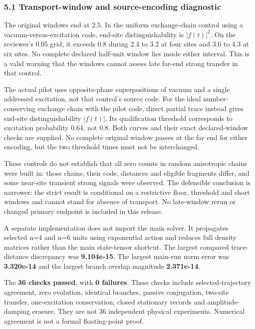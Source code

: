 \documentclass[
  10pt,
  a4paper,
]{article}
\makeatletter
\renewcommand\subsection{\@startsection{subsection}{2}{\z@}{-2ex \@plus -.8ex \@minus -.2ex}{.9ex \@plus .2ex}{\normalfont\large\bfseries}}
\makeatother
\begin{document}
\subsubsection{5.1 Transport-window and source-encoding
diagnostic}\label{transport-window-and-source-encoding-diagnostic}

The original windows end at 2.5. In the uniform exchange-chain control
using a vacuum-versus-excitation code, end-site distinguishability is
\(|f(t)|^2\). On the reviewer's 0.05 grid, it exceeds 0.8 during 2.4 to
3.2 at four sites and 3.6 to 4.3 at six sites. No complete declared
half-unit window lies inside either interval. This is a valid warning
that the windows cannot assess late far-end strong transfer in that
control.

The actual pilot uses opposite-phase superpositions of vacuum and a
single addressed excitation, not that control's source code. For the
ideal number-conserving exchange chain with the pilot code, direct
partial trace instead gives end-site distinguishability \(|f(t)|\). Its
qualification threshold corresponds to excitation probability 0.64, not
0.8. Both curves and their exact declared-window checks are supplied. No
complete original window passes at the far end for either encoding, but
the two threshold times must not be interchanged.

These controls do not establish that all zero counts in random
anisotropic chains were built in: those chains, their code, distances
and eligible fragments differ, and some near-site transient strong
signals were observed. The defensible conclusion is narrower: the strict
result is conditional on a restrictive floor, threshold and short
windows and cannot stand for absence of transport. No late-window rerun
or changed primary endpoint is included in this release.

\subsection{6. Verification}\label{verification}

A separate implementation does not import the main solver. It propagates
selected n=4 and n=6 units using exponential action and reduces full
density matrices rather than the main state-tensor shortcut. The largest
compared trace-distance discrepancy was \textbf{9.104e-15}. The largest
main-run norm error was \textbf{3.320e-14} and the largest branch
overlap magnitude \textbf{2.371e-14}.

The \textbf{36 checks passed}, with \textbf{0 failures}. These checks
include selected-trajectory agreement, zero evolution, identical
branches, passive conjugation, two-site transfer, one-excitation
conservation, closed stationary records and amplitude-damping erasure.
They are not 36 independent physical experiments. Numerical agreement is
not a formal floating-point proof.
\end{document}
